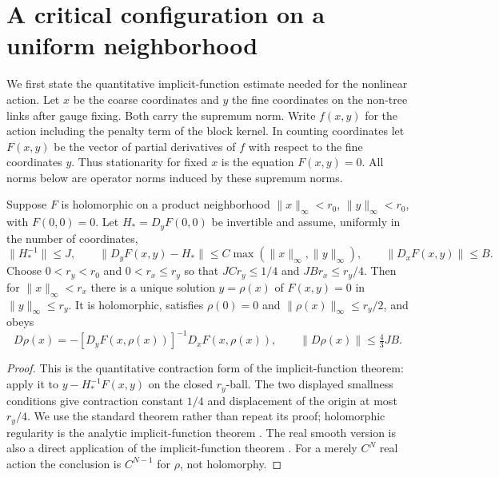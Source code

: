 \section{A critical configuration on a uniform neighborhood}
\label{ch05:stationary}

We first state the quantitative implicit-function estimate needed
for the nonlinear action. Let $x$ be the coarse coordinates and
$y$ the fine coordinates on the non-tree links after gauge fixing. Both carry the
supremum norm. Write $f(x,y)$ for the action including the
penalty term of the block kernel. In counting coordinates let $F(x,y)$ be the vector of
partial derivatives of $f$ with respect to the fine coordinates $y$.
Thus stationarity for fixed $x$ is the equation $F(x,y)=0$.
All norms below are operator norms induced by these supremum norms.

\begin{proposition}
\label{ch05:stationary-prop}
Suppose $F$ is holomorphic on a product neighborhood
$\|x\|_\infty<r_0$, $\|y\|_\infty<r_0$, with $F(0,0)=0$.
Let $H_*=D_yF(0,0)$ be invertible and assume, uniformly in the
number of coordinates,
\[
 \|H_*^{-1}\|\le J,\qquad
 \|D_yF(x,y)-H_*\|\le C\max(\|x\|_\infty,\|y\|_\infty),
 \qquad \|D_xF(x,y)\|\le B .
\]
Choose $0<r_y<r_0$ and $0<r_x\le r_y$ so that
$JC r_y\le1/4$ and $JB r_x\le r_y/4$.
Then for $\|x\|_\infty<r_x$ there is a unique solution
$y=\rho(x)$ of $F(x,y)=0$ in $\|y\|_\infty\le r_y$.
It is holomorphic, satisfies $\rho(0)=0$ and
$\|\rho(x)\|_\infty\le r_y/2$, and obeys
\[
 D\rho(x)=-[D_yF(x,\rho(x))]^{-1}D_xF(x,\rho(x)),
 \qquad \|D\rho(x)\|\le \tfrac43 JB .
\]
\end{proposition}

\begin{proof}
This is the quantitative contraction form of the implicit-function
theorem: apply it to $y-H_*^{-1}F(x,y)$ on the closed $r_y$-ball.
The two displayed smallness conditions give contraction constant
$1/4$ and displacement of the origin at most $r_y/4$.
We use the standard theorem rather than repeat its proof; holomorphic regularity is the analytic implicit-function theorem \cite[Theorem 1.3.8]{LeblSCV}. The real
smooth version is also a direct application of the implicit-function
theorem \cite[Theorem 9.28]{Rudin1976}.
For a merely $C^N$ real action the conclusion is $C^{N-1}$ for
$\rho$, not holomorphy.
\end{proof}

